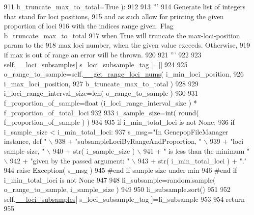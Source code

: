 \begin{DoxyCode}
911             b\_truncate\_max\_to\_total=\textcolor{keyword}{True} ):
912             
913         \textcolor{stringliteral}{'''}
914 \textcolor{stringliteral}{        Generate list of integers that stand for loci positions,}
915 \textcolor{stringliteral}{        and as such allow for printing the given proportion of loci}
916 \textcolor{stringliteral}{        with the indices range given.  Flag b\_truncate\_max\_to\_total}
917 \textcolor{stringliteral}{        when True will truncate the max-loci-position param to the}
918 \textcolor{stringliteral}{        max loci number, when the given value exceeds.  Otherwise,}
919 \textcolor{stringliteral}{        if max is out of range an error will be thrown.}
920 \textcolor{stringliteral}{}
921 \textcolor{stringliteral}{        '''}
922 
923         self.\hyperlink{classnegui_1_1genepopfilemanager_1_1GenepopFileManager_af867ba70728e8a3aaf0097ddd6399e28}{\_\_loci\_subsamples}[ s\_loci\_subsample\_tag ]=[]
924 
925         o\_range\_to\_sample=self.\hyperlink{classnegui_1_1genepopfilemanager_1_1GenepopFileManager_aaa92e1946fdacb522325a288e00eac71}{\_\_get\_range\_loci\_nums}( i\_min\_loci\_position, 
926                                                             i\_max\_loci\_position,
927                                                             b\_truncate\_max\_to\_total )
928         
929         i\_loci\_range\_interval\_size=len( o\_range\_to\_sample )
930 
931         f\_proportion\_of\_sample=float (i\_loci\_range\_interval\_size  ) * f\_proportion\_of\_total\_loci 
932 
933         i\_sample\_size=int( round(  f\_proportion\_of\_sample ) )
934         
935         \textcolor{keywordflow}{if} i\_min\_total\_loci \textcolor{keywordflow}{is} \textcolor{keywordflow}{not} \textcolor{keywordtype}{None}:
936             \textcolor{keywordflow}{if} i\_sample\_size < i\_min\_total\_loci:
937                 s\_msg=\textcolor{stringliteral}{"In GenepopFileManager instance, def "} \(\backslash\)
938                             + \textcolor{stringliteral}{"subsampleLociByRangeAndProportion, "} \(\backslash\)
939                             + \textcolor{stringliteral}{"loci sample size, "} \(\backslash\)
940                             + str( i\_sample\_size )  \(\backslash\)
941                             + \textcolor{stringliteral}{" is less than the minimum "} \(\backslash\)
942                             + \textcolor{stringliteral}{"given by the passed argument: "}  \(\backslash\)
943                             + str( i\_min\_total\_loci ) + \textcolor{stringliteral}{"."}
944                 \textcolor{keywordflow}{raise} Exception( s\_msg )
945             \textcolor{comment}{#end if sample size under min}
946         \textcolor{comment}{#end if i\_min\_total\_loci is not None}
947 
948         li\_subsample=random.sample( o\_range\_to\_sample, i\_sample\_size )
949 
950         li\_subsample.sort()
951 
952         self.\hyperlink{classnegui_1_1genepopfilemanager_1_1GenepopFileManager_af867ba70728e8a3aaf0097ddd6399e28}{\_\_loci\_subsamples}[ s\_loci\_subsample\_tag ]=li\_subsample
953 
954         \textcolor{keywordflow}{return}
955 
\end{DoxyCode}
